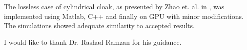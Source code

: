 \documentclass{article}
\begin{document}
The lossless case of cylindrical cloak, as presented by Zhao et. al. in \cite{Radial-Zhao}, was implemented using Matlab, C++ and finally on GPU with minor modifications. The simulations showed adequate similarity to accepted results.

\begin{acknowledgement}
I would like to thank Dr. Rashad Ramzan for his guidance.
\end{acknowledgement}
\newpage
\nocite{*}


\end{document}
